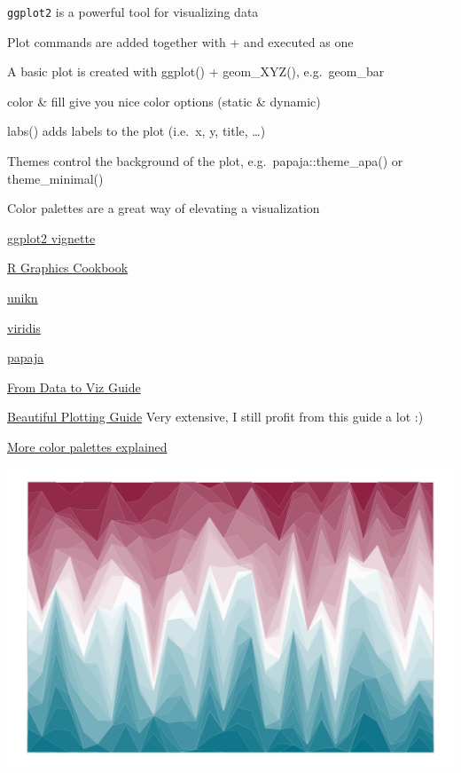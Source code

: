\documentclass[
]{book}
\begin{document}
\texttt{ggplot2} is a powerful tool for visualizing data

Plot commands are added together with + and executed as one

A basic plot is created with ggplot() + geom\_XYZ(), e.g.~geom\_bar

color \& fill give you nice color options (static \& dynamic)

labs() adds labels to the plot (i.e.~x, y, title, \ldots)

Themes control the background of the plot, e.g.~papaja::theme\_apa() or theme\_minimal()

Color palettes are a great way of elevating a visualization

\href{https://ggplot2.tidyverse.org/articles/ggplot2.html}{ggplot2 vignette}

\href{https://r-graphics.org/}{R Graphics Cookbook}

\href{https://hneth.github.io/unikn/index.html}{unikn}

\href{https://sjmgarnier.github.io/viridisLite/reference/viridis.html}{viridis}

\href{https://www.rdocumentation.org/packages/papaja/versions/0.1.2}{papaja}

\href{https://www.data-to-viz.com/}{From Data to Viz Guide}

\href{https://www.cedricscherer.com/2019/08/05/a-ggplot2-tutorial-for-beautiful-plotting-in-r/}{Beautiful Plotting Guide} Very extensive, I still profit from this guide a lot :)

\href{http://www.sthda.com/english/wiki/ggplot2-colors-how-to-change-colors-automatically-and-manually}{More color palettes explained}

\includegraphics{_main_files/figure-html/unikn-plot-1.pdf}
\end{document}
